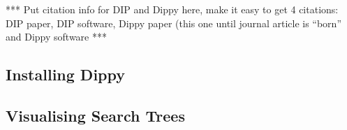 
*** Put citation info for DIP and Dippy here, make it easy to get 4 citations: DIP paper, DIP software, Dippy paper (this one until journal article is ``born'' and Dippy software ***

\subsection{Installing Dippy} \label{sbs:install}

\subsection{Visualising Search Trees} \label{sbs:gimpy}
